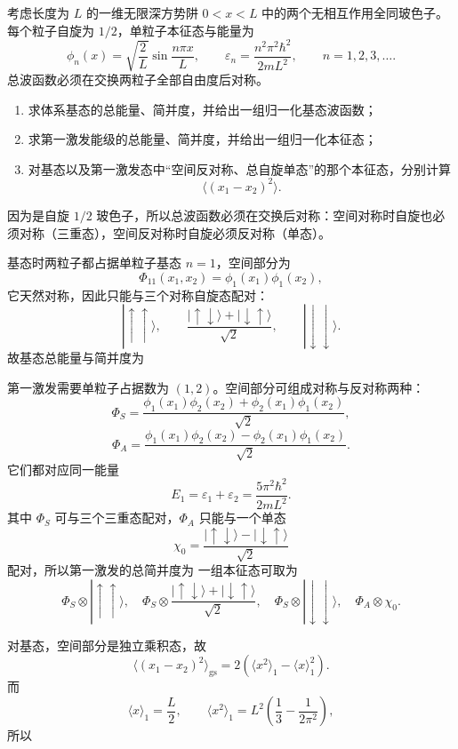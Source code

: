 \begin{question}
考虑长度为 $L$ 的一维无限深方势阱 $0<x<L$ 中的两个无相互作用全同玻色子。每个粒子自旋为 $1/2$，单粒子本征态与能量为
\[
\phi_n(x)=\sqrt{\frac{2}{L}}\sin\frac{n\pi x}{L},
\qquad
\varepsilon_n=\frac{n^2\pi^2\hbar^2}{2mL^2},
\qquad n=1,2,3,\dots.
\]
总波函数必须在交换两粒子全部自由度后对称。

\begin{enumerate}[label=(\arabic*),leftmargin=2.5em]
  \item 求体系基态的总能量、简并度，并给出一组归一化基态波函数；
  \item 求第一激发能级的总能量、简并度，并给出一组归一化本征态；
  \item 对基态以及第一激发态中“空间反对称、总自旋单态”的那个本征态，分别计算
  \[
  \langle (x_1-x_2)^2\rangle.
  \]
\end{enumerate}

\begin{solution}
因为是自旋 $1/2$ 玻色子，所以总波函数必须在交换后对称：空间对称时自旋也必须对称（三重态），空间反对称时自旋必须反对称（单态）。

基态时两粒子都占据单粒子基态 $n=1$，空间部分为
\[
\Phi_{11}(x_1,x_2)=\phi_1(x_1)\phi_1(x_2),
\]
它天然对称，因此只能与三个对称自旋态配对：
\[
|\uparrow\uparrow\rangle,
\qquad
\frac{|\uparrow\downarrow\rangle+|\downarrow\uparrow\rangle}{\sqrt2},
\qquad
|\downarrow\downarrow\rangle.
\]
故基态总能量与简并度为

第一激发需要单粒子占据数为 $(1,2)$。空间部分可组成对称与反对称两种：
\[
\Phi_S=\frac{\phi_1(x_1)\phi_2(x_2)+\phi_2(x_1)\phi_1(x_2)}{\sqrt2},
\]
\[
\Phi_A=\frac{\phi_1(x_1)\phi_2(x_2)-\phi_2(x_1)\phi_1(x_2)}{\sqrt2}.
\]
它们都对应同一能量
\[
E_1=\varepsilon_1+\varepsilon_2=\frac{5\pi^2\hbar^2}{2mL^2}.
\]
其中 $\Phi_S$ 可与三个三重态配对，$\Phi_A$ 只能与一个单态
\[
\chi_0=\frac{|\uparrow\downarrow\rangle-|\downarrow\uparrow\rangle}{\sqrt2}
\]
配对，所以第一激发的总简并度为
一组本征态可取为
\[
\Phi_S\otimes |\uparrow\uparrow\rangle,
\quad
\Phi_S\otimes \frac{|\uparrow\downarrow\rangle+|\downarrow\uparrow\rangle}{\sqrt2},
\quad
\Phi_S\otimes |\downarrow\downarrow\rangle,
\quad
\Phi_A\otimes \chi_0.
\]

对基态，空间部分是独立乘积态，故
\[
\langle (x_1-x_2)^2\rangle_{\mathrm{gs}}=2\left(\langle x^2\rangle_1-\langle x\rangle_1^2\right).
\]
而
\[
\langle x\rangle_1=\frac{L}{2},
\qquad
\langle x^2\rangle_1=L^2\left(\frac13-\frac{1}{2\pi^2}\right),
\]
所以


\end{solution}
\end{question}

